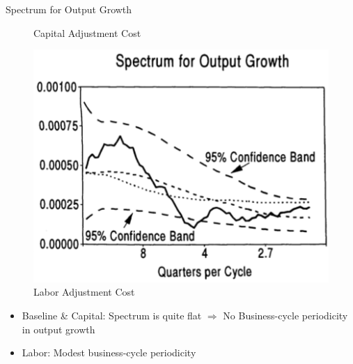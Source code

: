 \documentclass[10pt]{beamer}
\begin{document}
\begin{frame}{Spectrum for Output Growth}
\begin{minipage}{0.33\textwidth}
\begin{figure}
            \caption{Capital Adjustment Cost}
        \end{figure}
    \end{minipage}%
    \begin{minipage}{0.33\textwidth}
        \begin{figure}
            \centering
            \includegraphics[width=\linewidth]{figures/L_spect.png}
            \caption{Labor Adjustment Cost}
        \end{figure}
    \end{minipage}

    \begin{itemize}
        \item Baseline \& Capital: Spectrum is quite flat $\Rightarrow$ No Business-cycle
              periodicity in output growth
        \item Labor: Modest business-cycle periodicity
    \end{itemize}

\end{frame}
\end{document}
